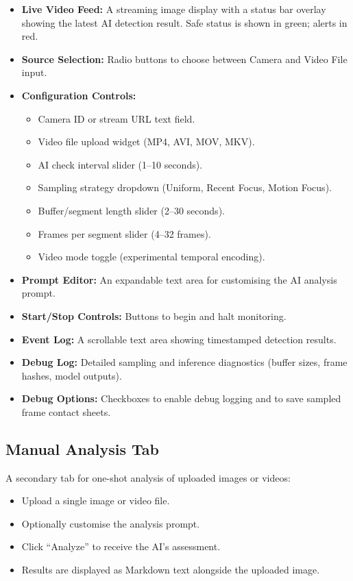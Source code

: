 \documentclass[12pt,a4paper]{article}
\begin{document}
\begin{itemize}
    \item \textbf{Live Video Feed:} A streaming image display with a status bar overlay showing the latest AI detection result. Safe status is shown in green; alerts in red.
    \item \textbf{Source Selection:} Radio buttons to choose between Camera and Video File input.
    \item \textbf{Configuration Controls:}
    \begin{itemize}[noitemsep]
        \item Camera ID or stream URL text field.
        \item Video file upload widget (MP4, AVI, MOV, MKV).
        \item AI check interval slider (1--10 seconds).
        \item Sampling strategy dropdown (Uniform, Recent Focus, Motion Focus).
        \item Buffer/segment length slider (2--30 seconds).
        \item Frames per segment slider (4--32 frames).
        \item Video mode toggle (experimental temporal encoding).
    \end{itemize}
    \item \textbf{Prompt Editor:} An expandable text area for customising the AI analysis prompt.
    \item \textbf{Start/Stop Controls:} Buttons to begin and halt monitoring.
    \item \textbf{Event Log:} A scrollable text area showing timestamped detection results.
    \item \textbf{Debug Log:} Detailed sampling and inference diagnostics (buffer sizes, frame hashes, model outputs).
    \item \textbf{Debug Options:} Checkboxes to enable debug logging and to save sampled frame contact sheets.
\end{itemize}

\subsection{Manual Analysis Tab}

A secondary tab for one-shot analysis of uploaded images or videos:

\begin{itemize}[noitemsep]
    \item Upload a single image or video file.
    \item Optionally customise the analysis prompt.
    \item Click ``Analyze'' to receive the AI's assessment.
    \item Results are displayed as Markdown text alongside the uploaded image.
\end{itemize}
\end{document}
